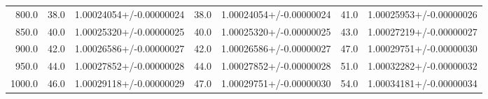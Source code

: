 \begin{tabular}{rrlrlrl}
  800.0 &  38.0 &    1.00024054+/-0.00000024 &  38.0 &    1.00024054+/-0.00000024 &  41.0 &    1.00025953+/-0.00000026 \\
  850.0 &  40.0 &    1.00025320+/-0.00000025 &  40.0 &    1.00025320+/-0.00000025 &  43.0 &    1.00027219+/-0.00000027 \\
  900.0 &  42.0 &    1.00026586+/-0.00000027 &  42.0 &    1.00026586+/-0.00000027 &  47.0 &    1.00029751+/-0.00000030 \\
  950.0 &  44.0 &    1.00027852+/-0.00000028 &  44.0 &    1.00027852+/-0.00000028 &  51.0 &    1.00032282+/-0.00000032 \\
 1000.0 &  46.0 &    1.00029118+/-0.00000029 &  47.0 &    1.00029751+/-0.00000030 &  54.0 &    1.00034181+/-0.00000034 \\
\bottomrule
\end{tabular}

